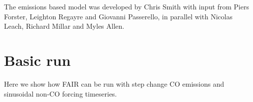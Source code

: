 \documentclass[letterpaper,10pt,english]{sphinxmanual}
\begin{document}
The emissions based model was developed by Chris Smith with input from
Piers Forster, Leighton Regayre and Giovanni Passerello, in parallel
with Nicolas Leach, Richard Millar and Myles Allen.

\begin{sphinxVerbatim}[commandchars=\\\{\}]
 
\end{sphinxVerbatim}

\begin{sphinxVerbatim}[commandchars=\\\{\}]
 
\end{sphinxVerbatim}

\begin{sphinxVerbatim}[commandchars=\\\{\}]
\end{sphinxVerbatim}

\begin{sphinxVerbatim}[commandchars=\\\{\}]
   

     
\PYG{p}{[}\PYG{p}{]}   
\end{sphinxVerbatim}


\section{Basic run}
\label{\detokenize{Example-Usage:basic-run}}
Here we show how FAIR can be run with step change CO
emissions and sinusoidal non-CO forcing timeseries.
\end{document}
